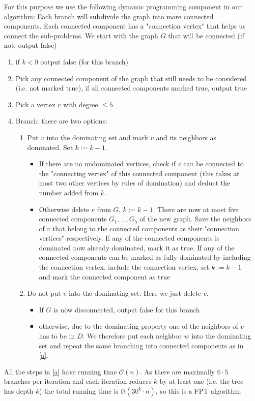 \documentclass{article}
\begin{document}
\begin{solving}
    For this purpose we use the following dynamic programming component in our algorithm: Each branch will subdivide the graph into more connected components. Each connected component has a "connection vertex" that helps us connect the sub-problems. We start with the graph $G$ that will be connected (if not: output false)
    \begin{enumerate}
        \item if $k<0$ output false (for this branch)
        \item Pick any connected component of the graph that still needs to be considered (i.e. not marked true), if all connected components marked true, output true
        \item Pick a vertex $v$ with degree $\leq 5$
        \item Branch: there are two options:\begin{enumerate}
            \item \label{a} Put $v$ into the dominating set and mark $v$ and its neighbors as dominated. Set $k:= k-1$.\begin{itemize}
                \item If there are no undominated vertices, check if $v$ can be connected to the "connecting vertex" of this connected component (this takes at most two other vertices by rules of domination) and deduct the number added from $k$.
                \item Otherwise delete $v$ from $G$, $k:= k-1$. There are now at most five connected components $G_1,\dots, G_5$ of the new graph. Save the neighbors of $v$ that belong to the connected components as their "connection vertices" respectively. If any of the connected components is dominated now already dominated, mark it as true. If any of the connected components can be marked as fully dominated by including the connection vertex, include the connection vertex, set $k:= k-1$ and mark the connected component as true
            \end{itemize}
        \item Do not put $v$ into the dominating set: Here we just delete $v$. \begin{itemize}
            \item If $G$ is now disconnected, output false for this branch
            \item otherwise, due to the dominating property one of the neighbors of $v$ has to be in $D$. We therefore put each neighbor $w$ into the dominating set and repeat the same branching into connected components as in \ref{a}.
            \end{itemize}
        \end{enumerate}           
    \end{enumerate}
    All the steps in \ref{a} have running time $\mathcal O(n)$. As there are maximally $6\cdot 5$ branches per iteration and each iteration reduces $k$ by at least one (i.e. the tree has depth $k$) the total running time is $\mathcal O(30^k\cdot n)$, so this is a FPT algorithm.
    
\end{solving}
\newpage
\end{document}
